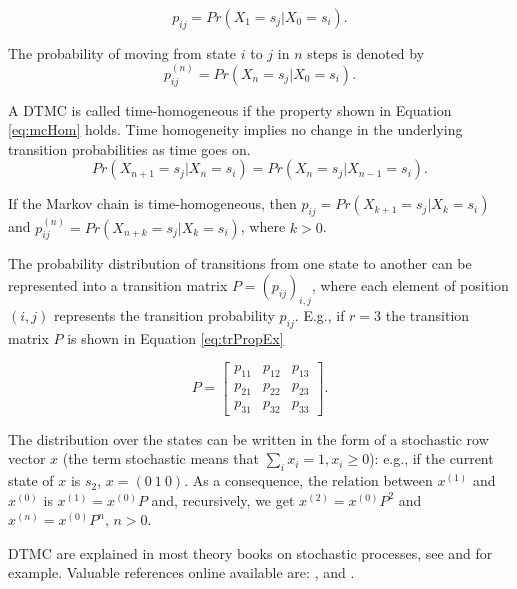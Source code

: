 \documentclass[
  nojss]{jss}
\begin{document}
\begin{equation}
p_{ij}=Pr\left(X_{1}=s_{j}\left|X_{0}=s_{i}\right.\right).
\label{eq:trProp}
\end{equation}

The probability of moving from state \(i\) to \(j\) in \(n\) steps is denoted by
\[p_{ij}^{(n)}=Pr\left(X_{n}=s_{j}\left|X_{0}=s_{i}\right.\right).\]

A DTMC is called time-homogeneous if the property shown in Equation \ref{eq:mcHom} holds. Time homogeneity implies no change in the underlying transition probabilities as time goes on.
\begin{equation}
Pr\left(X_{n+1}=s_{j}\left|X_{n}=s_{i}\right.\right)=Pr\left(X_{n}=s_{j}\left|X_{n-1}=s_{i}\right.\right).
\label{eq:mcHom}
\end{equation}

If the Markov chain is time-homogeneous, then \(p_{ij}=Pr\left(X_{k+1}=s_{j}\left|X_{k}=s_{i}\right.\right)\) and \newline \(p_{ij}^{(n)}=Pr\left(X_{n+k}=s_{j}\left|X_{k}=s_{i}\right.\right)\), where \(k>0\).

The probability distribution of transitions from one state to another can be represented into a transition matrix \(P=(p_{ij})_{i,j}\), where each element of position \((i,j)\) represents the transition probability \(p_{ij}\). E.g., if \(r=3\) the transition matrix \(P\) is shown in Equation \ref{eq:trPropEx}

\begin{equation}
P=\left[\begin{array}{ccc}
p_{11} & p_{12} & p_{13}\\
p_{21} & p_{22} & p_{23}\\
p_{31} & p_{32} & p_{33}
\end{array}\right].
\label{eq:trPropEx}
\end{equation}

The distribution over the states can be written in the form of a stochastic row vector \(x\) (the term stochastic means that \(\sum_{i}x_{i}=1, x_{i} \geq 0\)): e.g., if the current state of \(x\) is \(s_{2}\), \(x=\left(0\:1\:0\right)\). As a consequence, the relation between \(x^{(1)}\) and \(x^{(0)}\) is \(x^{(1)}=x^{(0)}P\) and, recursively, we get \(x^{(2)}=x^{(0)}P^{2}\) and \(x^{(n)}=x^{(0)}P^{n},\, n>0\).

DTMC are explained in most theory books on stochastic processes, see \cite{bremaud1999discrete} and \cite{dobrow2016introduction} for example. Valuable references online available are: \cite{konstantopoulos2009markov}, \cite{probBook} and \cite{bardPpt}.
\end{document}
